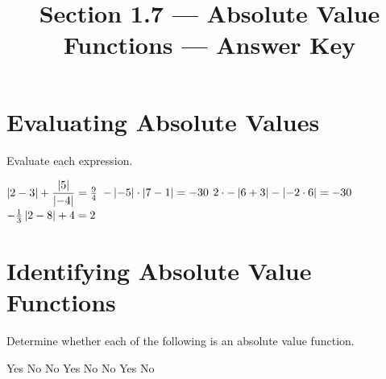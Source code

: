 

\title{Section 1.7 --- Absolute Value Functions --- Answer Key}


\maketitle

\section*{Evaluating Absolute Values}
Evaluate each expression.
\begin{smenum}
\mitemxx
{$\left|2-3\right|+\dfrac{\left|5\right|}{\left|-4\right|}=\frac{9}{4}$}
{$-\left|-5\right|\cdot\left|7-1\right|=-30$}
\mitemxx
{$2\cdot-\left|6+3\right|-\left|-2\cdot 6\right|=-30$}
{$-\frac{1}{3}\left|2-8\right|+4=2$}
\end{smenum}

\section*{Identifying Absolute Value Functions}
Determine whether each of the following is an absolute value function.
\begin{smenum}
\mitemxxxx
{Yes}
{No}
{No}
{Yes}
\mitemxxxx
{No}
{No}
{Yes}
{No}
\end{smenum}

